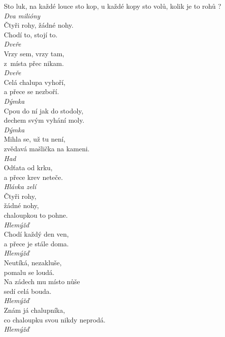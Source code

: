 \begin{multicols}{\value{columnsthindata}}
\noindent
Sto luk, na každé louce sto kop, u každé kopy sto volů, kolik
je to rohů ?\\[1 mm]
{\sl Dva milióny}\\

\noindent
Čtyři rohy, žádné nohy.\\
Chodí to, stojí to.\\[1 mm]
{\sl Dveře}\\

\noindent
Vrzy sem, vrzy tam,\\
z~místa přec nikam.\\[1 mm]
{\sl Dveře}\\

\noindent
Celá chalupa vyhoří,\\
a přece se nezboří.\\[1 mm]
{\sl Dýmka}\\

\noindent
Cpou do ní jak do stodoly,\\
dechem svým vyhání moly.\\[1 mm]
{\sl Dýmka}\\

\noindent
Mihla se, už tu není,\\
zvědavá mašlička na kameni.\\[1 mm]
{\sl Had}\\

\noindent
Odťata od krku,\\
a přece krev neteče.\\[1 mm]
{\sl Hlávka zelí}\\

\noindent
Čtyři rohy,\\
žádné nohy,\\
chaloupkou to pohne.\\[1 mm]
{\sl Hlemýžď}\\

\noindent
Chodí každý den ven,\\
a přece je stále doma.\\[1 mm]
{\sl Hlemýžď}\\

\noindent
Neutíká, nezakluše,\\
pomalu se loudá.\\
Na zádech mu místo nůše\\
sedí celá bouda.\\[1 mm]
{\sl Hlemýžď}\\

\noindent
Znám já chalupníka,\\
co chaloupku svou nikdy neprodá.\\[1 mm]
{\sl Hlemýžď}\\


\end{multicols}
